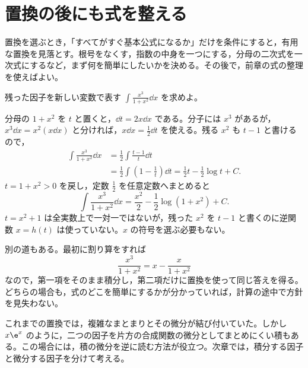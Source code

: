 \section{置換の後にも式を整える}\label{節:置換後の整理}

置換を選ぶとき，「すべてがすぐ基本公式になるか」だけを条件にすると，有用な置換を見落とす。根号をなくす，指数の中身を一つにする，分母の二次式を一次式にするなど，まず何を簡単にしたいかを決める。その後で，前章の式の整理を使えばよい。

\begin{example}{残った因子を新しい変数で表す}
$\int\frac{x^3}{1+x^2}\dd x$ を求めよ。
\end{example}

分母の $1+x^2$ を $t$ と置くと，$\dd t=2x\dd x$ である。分子には $x^3$ があるが，$x^3\dd x=x^2(x\dd x)$ と分ければ，$x\dd x=\frac12\dd t$ を使える。残る $x^2$ も $t-1$ と書けるので，
\[
\begin{aligned}
 \int\frac{x^3}{1+x^2}\dd x
 &=\frac12\int\frac{t-1}{t}\dd t\\
 &=\frac12\int\left(1-\frac1t\right)\dd t
 =\frac12t-\frac12\log t+C.
\end{aligned}
\]
$t=1+x^2>0$ を戻し，定数 $\frac12$ を任意定数へまとめると
\[
 \int\frac{x^3}{1+x^2}\dd x
 =\frac{x^2}{2}-\frac12\log(1+x^2)+C.
\]
$t=x^2+1$ は全実数上で一対一ではないが，残った $x^2$ を $t-1$ と書くのに逆関数 $x=h(t)$ は使っていない。$x$ の符号を選ぶ必要もない。

別の道もある。最初に割り算をすれば
\[
 \frac{x^3}{1+x^2}=x-\frac{x}{1+x^2}
\]
なので，第一項をそのまま積分し，第二項だけに置換を使って同じ答えを得る。どちらの場合も，式のどこを簡単にするかが分かっていれば，計算の途中で方針を見失わない。

これまでの置換では，複雑なまとまりとその微分が結び付いていた。しかし $x\e^x$ のように，二つの因子を片方の合成関数の微分としてまとめにくい積もある。この場合には，積の微分を逆に読む方法が役立つ。次章では，積分する因子と微分する因子を分けて考える。

